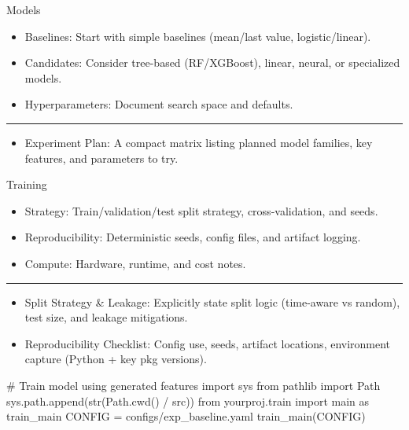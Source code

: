 \documentclass[
  letterpaper,
  DIV=11,
  numbers=noendperiod]{scrartcl}
\newenvironment{Shaded}{\begin{snugshade}}{\end{snugshade}}
\newcommand{\BuiltInTok}[1]{\textcolor[rgb]{0.00,0.23,0.31}{#1}}
\newcommand{\CommentTok}[1]{\textcolor[rgb]{0.37,0.37,0.37}{#1}}
\newcommand{\ImportTok}[1]{\textcolor[rgb]{0.00,0.46,0.62}{#1}}
\newcommand{\NormalTok}[1]{\textcolor[rgb]{0.00,0.23,0.31}{#1}}
\newcommand{\OperatorTok}[1]{\textcolor[rgb]{0.37,0.37,0.37}{#1}}
\newcommand{\StringTok}[1]{\textcolor[rgb]{0.13,0.47,0.30}{#1}}
\providecommand{\tightlist}{%
  \setlength{\itemsep}{0pt}\setlength{\parskip}{0pt}}
\renewenvironment{Shaded}{%
  \begin{tcolorbox}[%
    colback=codebg,%
    colframe=codebg,%
    borderline west={3pt}{0pt}{sectionblue},%
    boxrule=0pt,%
    arc=0pt,%
    boxsep=5pt,%
    left=2mm,%
    right=2mm,%
    top=2mm,%
    bottom=2mm%
  ]%
}{%
  \end{tcolorbox}%
}
\begin{document}
Models

\begin{itemize}
\tightlist
\item
  Baselines: Start with simple baselines (mean/last value,
  logistic/linear).
\item
  Candidates: Consider tree-based (RF/XGBoost), linear, neural, or
  specialized models.
\item
  Hyperparameters: Document search space and defaults.
\end{itemize}

\begin{center}\rule{0.5\linewidth}{0.5pt}\end{center}

\begin{itemize}
\tightlist
\item
  Experiment Plan: A compact matrix listing planned model families, key
  features, and parameters to try.
\end{itemize}

Training

\begin{itemize}
\tightlist
\item
  Strategy: Train/validation/test split strategy, cross-validation, and
  seeds.
\item
  Reproducibility: Deterministic seeds, config files, and artifact
  logging.
\item
  Compute: Hardware, runtime, and cost notes.
\end{itemize}

\begin{center}\rule{0.5\linewidth}{0.5pt}\end{center}

\begin{itemize}
\tightlist
\item
  Split Strategy \& Leakage: Explicitly state split logic (time-aware vs
  random), test size, and leakage mitigations.
\item
  Reproducibility Checklist: Config use, seeds, artifact locations,
  environment capture (Python + key pkg versions).
\end{itemize}

\begin{Shaded}
\begin{Highlighting}[]
\CommentTok{\# Train model using generated features}
\ImportTok{import}\NormalTok{ sys}
\ImportTok{from}\NormalTok{ pathlib }\ImportTok{import}\NormalTok{ Path}
\NormalTok{sys.path.append(}\BuiltInTok{str}\NormalTok{(Path.cwd() }\OperatorTok{/} \StringTok{\textquotesingle{}src\textquotesingle{}}\NormalTok{))}
\ImportTok{from}\NormalTok{ yourproj.train }\ImportTok{import}\NormalTok{ main }\ImportTok{as}\NormalTok{ train\_main}
\NormalTok{CONFIG }\OperatorTok{=} \StringTok{\textquotesingle{}configs/exp\_baseline.yaml\textquotesingle{}}
\NormalTok{train\_main(CONFIG)}
\end{Highlighting}
\end{Shaded}
\end{document}
